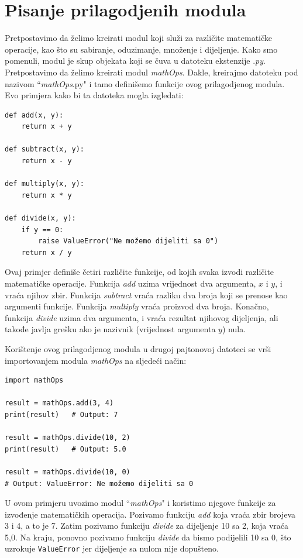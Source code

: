  
\section{Pisanje prilagodjenih modula}

Pretpostavimo da želimo kreirati modul koji služi za različite matematičke operacije, kao što su sabiranje, oduzimanje, množenje i dijeljenje. Kako smo pomenuli, modul je skup objekata koji se  čuva u datoteku ekstenzije .\textit{py}. Pretpostavimo da želimo kreirati modul \textit{mathOps}. Dakle, kreirajmo  datoteku pod nazivom ``\textit{mathOps}.py" i tamo definišemo funkcije ovog prilagodjenog modula. Evo primjera kako bi ta datoteka mogla izgledati:

\begin{verbatim}
def add(x, y):
    return x + y

def subtract(x, y):
    return x - y

def multiply(x, y):
    return x * y

def divide(x, y):
    if y == 0:
        raise ValueError("Ne možemo dijeliti sa 0")
    return x / y
\end{verbatim}
Ovaj  primjer definiše četiri različite funkcije, od kojih svaka izvodi različite matematičke operacije. Funkcija \textit{add} uzima vrijednost dva argumenta, $x$ i $y$, i vraća njihov zbir. Funkcija \textit{subtract}   vraća razliku dva broja koji se prenose kao argumenti funkcije. Funkcija \textit{multiply} vraća proizvod dva broja. Konačno, funkcija \textit{divide} uzima dva argumenta, i vraća rezultat njihovog dijeljenja, ali takođe  javlja  grešku ako je nazivnik (vrijednost argumenta $y$) nula.

Korištenje ovog prilagodjenog modula u drugoj pajtonovoj datoteci se vrši importovanjem modula \textit{mathOps} na sljedeći način:

\begin{verbatim}
import mathOps

result = mathOps.add(3, 4)
print(result)   # Output: 7

result = mathOps.divide(10, 2)
print(result)   # Output: 5.0

result = mathOps.divide(10, 0)
# Output: ValueError: Ne možemo dijeliti sa 0
\end{verbatim}

U ovom primjeru uvozimo modul ``\textit{mathOps}" i koristimo njegove funkcije za izvođenje matematičkih operacija. Pozivamo funkciju  \textit{add}  koja vraća zbir brojeva 3 i 4, a to je 7. Zatim pozivamo funkciju  \textit{divide}  za dijeljenje 10 sa 2, koja vraća 5,0. Na kraju, ponovno pozivamo funkciju  \textit{divide}  da bismo podijelili 10 sa 0, što uzrokuje \texttt{ValueError} jer dijeljenje sa nulom nije dopušteno.


